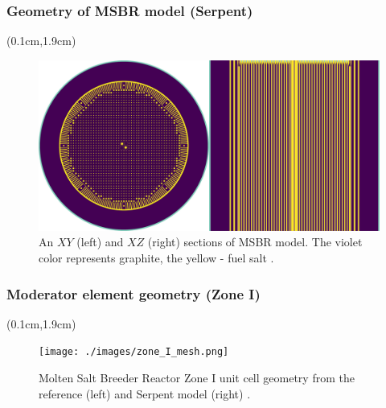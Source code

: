 \begin{frame}
\frametitle{Geometry of MSBR model (Serpent)}

\begin{textblock*}{12.5cm}(0.1cm,1.9cm) %
\begin{figure}      
	\includegraphics[width=\textwidth]{./images/geometry_main_views.png}
	\caption{An $XY$ (left) and $XZ$ (right) sections of \gls{MSBR} model. 
		The violet color represents graphite, the yellow - fuel salt 	
		\cite{rykhlevskii_full-core_2017}.}
\end{figure}
\end{textblock*}
\end{frame}

\begin{frame}
\frametitle{Moderator element geometry (Zone I)}
\begin{textblock*}{12.5cm}(0.1cm,1.9cm) %
\begin{figure}[t]
\texttt{[image: ./images/zone\_I\_mesh.png]}
\vspace{-5mm}
\caption{Molten Salt Breeder Reactor Zone I unit cell geometry from the 
	reference \cite{robertson_conceptual_1971} (left) and Serpent model 
	(right) \cite{rykhlevskii_full-core_2017}.}
\end{figure}
\end{textblock*}

\end{frame}


